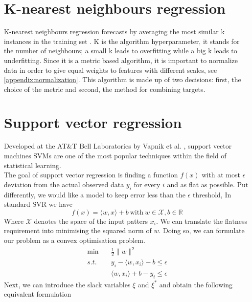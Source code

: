 \section{K-nearest neighbours regression}
K-nearest neighbours regression forecasts by averaging the most similar k instances in the training set \cite{macqueen1967some}. K is the algorithm hyperparameter, it stands for the number of neighbours; a small k leads to overfitting while a big k leads to underfitting. 
Since it is a metric based algorithm, it is important to normalize data in order to give equal weights to features with different scales, see \ref{appendix:normalization}.
This algorithm is made up of two decisions: first, the choice of the metric and second, the method for combining targets.


\section{Support vector regression}
Developed at the AT\&T Bell Laboratories by Vapnik et al. \cite{cortes1995support} \cite{vapnik1997support}, support vector machines SVMs are one of the most popular techniques within the field of statistical learning.
\\
The goal of support vector regression is finding a function $f(x)$ with at most $\epsilon$ deviation from the actual observed data $y_i$ for every $i$ and as flat as possible. 
Put differently, we would like a model to keep error less than the $\epsilon$ threshold,  
In standard SVR we have
\begin{equation}
    f(x)=\langle w,x \rangle +b \ \textrm{with} \ w \in \mathcal{X}, b \in \mathbb{R}
\end{equation}
Where $\mathcal{X}$ denotes the space of the input patters $x_i$.
We can translate the flatness requirement into minimising the squared norm of $w$. Doing so, we can formulate our problem as a convex optimisation problem.
\begin{equation}
    \begin{aligned}
        \min \quad& \frac{1}{2}\|w\|^2
        \\
        s.t. \quad& y_i-\langle w, x_i\rangle-b\leq \epsilon
        \\
        \quad& \langle w, x_i\rangle +b-y_i\leq \epsilon
    \end{aligned}
\end{equation}
Next, we can introduce the slack variables $\xi$ and $\xi^*$ and obtain the following equivalent formulation

